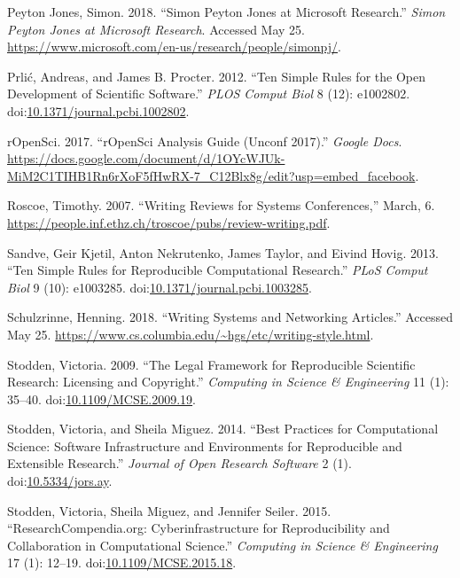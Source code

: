 \documentclass[fleqn,10pt]{wlpeerj} %
\begin{document}
\hypertarget{ref-peyton_jones_simon_nodate}{}
Peyton Jones, Simon. 2018. ``Simon Peyton Jones at Microsoft Research.''
\emph{Simon Peyton Jones at Microsoft Research}. Accessed May 25.
\url{https://www.microsoft.com/en-us/research/people/simonpj/}.

\hypertarget{ref-prlic_ten_2012}{}
Prlić, Andreas, and James B. Procter. 2012. ``Ten Simple Rules for the
Open Development of Scientific Software.'' \emph{PLOS Comput Biol} 8
(12): e1002802.
doi:\href{https://doi.org/10.1371/journal.pcbi.1002802}{10.1371/journal.pcbi.1002802}.

\hypertarget{ref-ropensci_ropensci_2017}{}
rOpenSci. 2017. ``rOpenSci Analysis Guide (Unconf 2017).'' \emph{Google
Docs}.
\url{https://docs.google.com/document/d/1OYcWJUk-MiM2C1TIHB1Rn6rXoF5fHwRX-7_C12Blx8g/edit?usp=embed_facebook}.

\hypertarget{ref-roscoe_writing_2007}{}
Roscoe, Timothy. 2007. ``Writing Reviews for Systems Conferences,''
March, 6.
\url{https://people.inf.ethz.ch/troscoe/pubs/review-writing.pdf}.

\hypertarget{ref-sandve_ten_2013}{}
Sandve, Geir Kjetil, Anton Nekrutenko, James Taylor, and Eivind Hovig.
2013. ``Ten Simple Rules for Reproducible Computational Research.''
\emph{PLoS Comput Biol} 9 (10): e1003285.
doi:\href{https://doi.org/10.1371/journal.pcbi.1003285}{10.1371/journal.pcbi.1003285}.

\hypertarget{ref-schulzrinne_writing_nodate}{}
Schulzrinne, Henning. 2018. ``Writing Systems and Networking Articles.''
Accessed May 25.
\url{https://www.cs.columbia.edu/~hgs/etc/writing-style.html}.

\hypertarget{ref-stodden_legal_2009}{}
Stodden, Victoria. 2009. ``The Legal Framework for Reproducible
Scientific Research: Licensing and Copyright.'' \emph{Computing in
Science \& Engineering} 11 (1): 35--40.
doi:\href{https://doi.org/10.1109/MCSE.2009.19}{10.1109/MCSE.2009.19}.

\hypertarget{ref-stodden_best_2014}{}
Stodden, Victoria, and Sheila Miguez. 2014. ``Best Practices for
Computational Science: Software Infrastructure and Environments for
Reproducible and Extensible Research.'' \emph{Journal of Open Research
Software} 2 (1).
doi:\href{https://doi.org/10.5334/jors.ay}{10.5334/jors.ay}.

\hypertarget{ref-stodden_researchcompendia.org:_2015}{}
Stodden, Victoria, Sheila Miguez, and Jennifer Seiler. 2015.
``ResearchCompendia.org: Cyberinfrastructure for Reproducibility and
Collaboration in Computational Science.'' \emph{Computing in Science \&
Engineering} 17 (1): 12--19.
doi:\href{https://doi.org/10.1109/MCSE.2015.18}{10.1109/MCSE.2015.18}.
\end{document}
